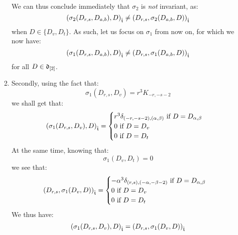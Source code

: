 \begin{example}
\begin{enumerate}
$$\begin{aligned}
                        \end{aligned}
                    $$
                We can thus conclude immediately that $\sigma_2$ is \textit{not} invariant, as:
                    $$\left( \sigma_2(D_{r, s}, D_{a, b}), D \right)_{\hat{\mathfrak{t}}} \not = \left( D_{r, s}, \sigma_2(D_{a, b}, D) \right)_{\hat{\mathfrak{t}}}$$
                when $D \in \{D_v, D_t\}$. As such, let us focus on $\sigma_1$ from now on, for which we now have:
                    $$\left( \sigma_1(D_{r, s}, D_{a, b}), D \right)_{\hat{\mathfrak{t}}} \not = \left( D_{r, s}, \sigma_1(D_{a, b}, D) \right)_{\hat{\mathfrak{t}}}$$
                for all $D \in \mathfrak{d}_{[2]}$.
                \item Secondly, using the fact that:
                    $$\sigma_1(D_{r, s}, D_v) = r^3 K_{-r, -s - 2}$$
                we shall get that:
                    $$
                        \left( \sigma_1(D_{r, s}, D_v), D \right)_{\hat{\mathfrak{t}}} =
                        \begin{cases}
                            \text{$r^3 \delta_{(-r, -s - 2), (\alpha, \beta)}$ if $D = D_{\alpha, \beta}$}
                            \\
                            \text{$0$ if $D = D_v$}
                            \\
                            \text{$0$ if $D = D_t$}
                        \end{cases}
                    $$
                At the same time, knowing that:
                    $$\sigma_1(D_v, D_t) = 0$$
                we see that:
                    $$
                        \begin{aligned}
                            \left( D_{r, s}, \sigma_1(D_v, D) \right)_{\hat{\mathfrak{t}}} =
                            \begin{cases}
                                \text{$-\alpha^3 \delta_{(r, s), (-\alpha, -\beta - 2)}$ if $D = D_{\alpha, \beta}$}
                                \\
                                \text{$0$ if $D = D_v$}
                                \\
                                \text{$0$ if $D = D_t$}
                            \end{cases}
                        \end{aligned}
                    $$
                We thus have:
                    $$\left( \sigma_1(D_{r, s}, D_v), D \right)_{\hat{\mathfrak{t}}} = \left( D_{r, s}, \sigma_1(D_v, D) \right)_{\hat{\mathfrak{t}}}$$

\end{enumerate}
\end{example}
